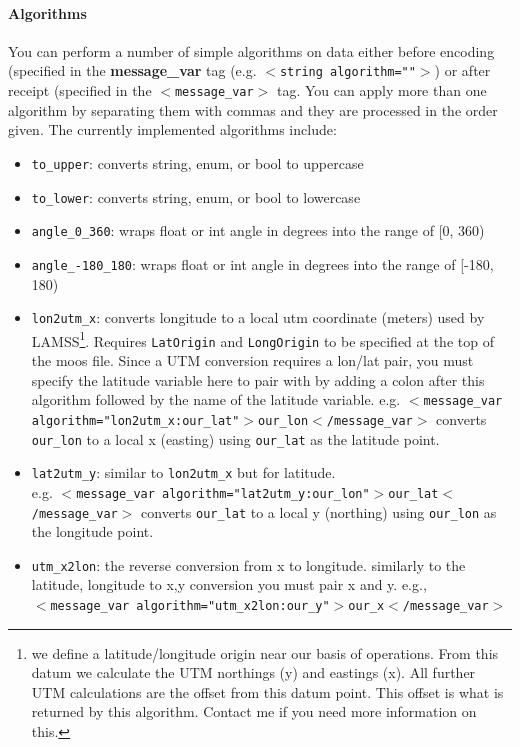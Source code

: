 \documentclass[11pt, letterpaper, oneside]{memoir}
\newcommand{\xmltag}[1]{\texttt{$<$#1$>$}}
\begin{document}
\begin{itemize}
\paragraph{Algorithms}
You can perform a number of simple algorithms on data either before encoding (specified in the \textbf{message\_var} tag (e.g. \xmltag{string algorithm=""}) or after receipt (specified in the \xmltag{message\_var} tag. You can apply more than one algorithm by separating them with commas and they are processed in the order given. The currently implemented algorithms include:
\begin{itemize}
\item \verb|to_upper|: converts string, enum, or bool to uppercase
\item \verb|to_lower|: converts string, enum, or bool to lowercase
\item \verb|angle_0_360|: wraps float or int angle in degrees into the range of [0, 360)
\item \verb|angle_-180_180|: wraps float or int angle in degrees into the range of [-180, 180)
\item \verb|lon2utm_x|: converts longitude to a local utm coordinate (meters) used by LAMSS\footnote{we define a latitude/longitude origin near our basis of operations. From this datum we calculate the UTM northings (y) and eastings (x). All further UTM calculations are the offset from this datum point. This offset is what is returned by this algorithm. Contact me if you need more information on this.}. Requires \verb|LatOrigin| and \verb|LongOrigin| to be specified at the top of the moos file. Since a UTM conversion requires a lon/lat pair, you must specify the latitude variable here to pair with by adding a colon after this algorithm followed by the name of the latitude variable. e.g. \xmltag{message\_var algorithm="lon2utm\_x:our\_lat"$>$our\_lon$<$/message\_var} converts \verb|our_lon| to a local x (easting) using \verb|our_lat| as the latitude point.
\item \verb|lat2utm_y|: similar to \verb|lon2utm_x| but for latitude. \\ e.g. \xmltag{message\_var algorithm="lat2utm\_y:our\_lon"$>$our\_lat$<$/message\_var} converts \verb|our_lat| to a local y (northing) using \verb|our_lon| as the longitude point.
\item \verb|utm_x2lon|: the reverse conversion from x to longitude. similarly to the latitude, longitude to x,y conversion you must pair x and y. e.g., \\ \xmltag{message\_var algorithm="utm\_x2lon:our\_y"$>$our\_x$<$/message\_var}

\end{itemize}
\end{itemize}
\end{document}
